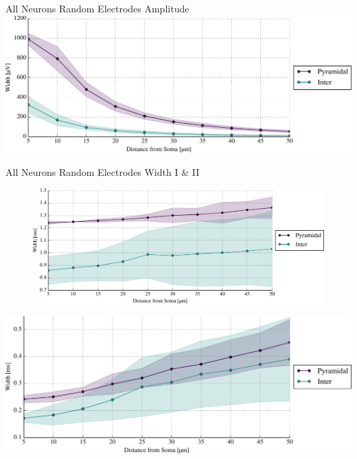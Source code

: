 \documentclass{beamer}
\begin{document}
\begin{frame}{All Neurons Random Electrodes Amplitude}{}
    \centering
    \includegraphics[width=1.0\textwidth]{images/amps_II_all.pdf}
\end{frame}

\begin{frame}{All Neurons Random Electrodes Width I \& II}{}
    \centering
    \begin{figure}
    \includegraphics[height=0.4\textheight]{images/widths_I_all.pdf}\\
    \end{figure}
    \includegraphics[height=0.4\textheight]{images/widths_II_all.pdf}
\end{frame}
\end{document}
